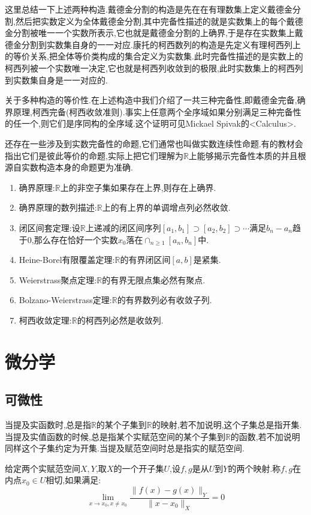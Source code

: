 这里总结一下上述两种构造.戴德金分割的构造是先在在有理数集上定义戴德金分割,然后把实数定义为全体戴德金分割,其中完备性描述的就是实数集上的每个戴德金分割被唯一一个实数所表示,它也就是戴德金分割的上确界,于是存在实数集上戴德金分割到实数集自身的一一对应.康托的柯西数列的构造是先定义有理柯西列上的等价关系,把全体等价类构成的集合定义为实数集.此时完备性描述的是实数上的柯西列被一个实数唯一决定,它也就是柯西列收敛到的极限,此时实数集上的柯西列到实数集自身是一一对应的.

关于多种构造的等价性.在上述构造中我们介绍了一共三种完备性,即戴德金完备,确界原理,柯西完备(柯西收敛准则).事实上任意两个全序域如果分别满足三种完备性的任一个,则它们是序同构的全序域.这个证明可见Mickael Spivak的<Calculus>.

还存在一些涉及到实数完备性的命题,它们通常也叫做实数连续性命题.有的教材会指出它们是彼此等价的命题,实际上把它们理解为$\mathbb{R}$上能够揭示完备性本质的并且根源自实数构造本身的命题更为准确.
\begin{enumerate}
	\item 确界原理:$\mathbb{R}$上的非空子集如果存在上界,则存在上确界.
	\item 确界原理的数列描述:$\mathbb{R}$上的有上界的单调增点列必然收敛.
	\item 闭区间套定理:设$\mathbb{R}$上递减的闭区间序列$[a_1,b_1]\supset[a_2,b_2]\supset\cdots$满足$b_n-a_n$趋于0,那么存在恰好一个实数$x_0$落在$\cap_{n\ge1}[a_n,b_n]$中.
	\item Heine-Borel有限覆盖定理:$\mathbb{R}$的有界闭区间$[a,b]$是紧集.
	\item Weierstrass聚点定理:$\mathbb{R}$的有界无限点集必然有聚点.
	\item Bolzano-Weierstrass定理:$\mathbb{R}$的有界数列必有收敛子列.
	\item 柯西收敛定理:$\mathbb{R}$的柯西列必然是收敛列.
\end{enumerate}
\newpage
\section{微分学}
\subsection{可微性}

当提及实函数时,总是指$\mathbb{R}$的某个子集到$\mathbb{R}$的映射,若不加说明,这个子集总是指开集.当提及实值函数的时候,总是指某个实赋范空间的某个子集到$\mathbb{R}$的函数,若不加说明同样这个子集约定为开集.当提及赋范空间时总是指实的赋范空间.

给定两个实赋范空间$X,Y$,取$X$的一个开子集$U$,设$f,g$是从$U$到$Y$的两个映射.称$f,g$在内点$x_0\in U$相切,如果满足:
$$\lim_{x\to x_0,x\not=x_0}\frac{\| f(x)-g(x)\|_Y}{\| x-x_0\|_X}=0$$

